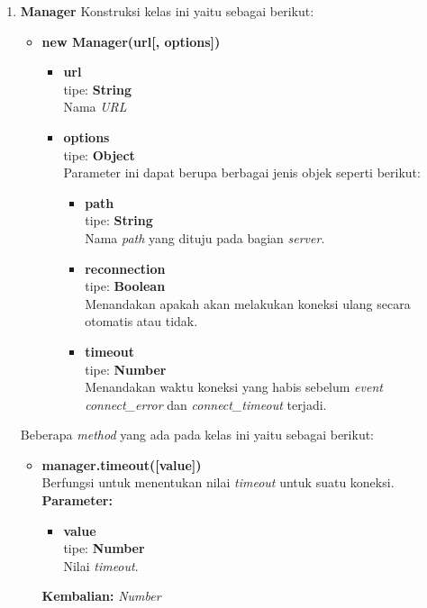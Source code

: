 \begin{enumerate}
	\item \textbf{Manager}
	Konstruksi kelas ini yaitu sebagai berikut:
	\begin{itemize}
		\item \textbf{new Manager(url[, options])} \\
		\begin{itemize}
			\item \textbf{url} \\tipe: \textbf{String} \\ Nama \textit{URL}
			\item \textbf{options} \\tipe: \textbf{Object} \\ Parameter ini dapat berupa berbagai jenis objek seperti berikut:
			\begin{itemize}
				\item \textbf{path} \\tipe: \textbf{String} \\ Nama \textit{path} yang dituju pada bagian \textit{server}.
				\item \textbf{reconnection} \\tipe: \textbf{Boolean} \\ Menandakan apakah akan melakukan koneksi ulang secara otomatis atau tidak.
				\item \textbf{timeout} \\tipe: \textbf{Number} \\ Menandakan waktu koneksi yang habis sebelum \textit{event connect\_error} dan \textit{connect\_timeout} terjadi.
			\end{itemize}
		\end{itemize}
	\end{itemize}

	Beberapa \textit{method} yang ada pada kelas ini yaitu sebagai berikut:
	\begin{itemize}
		\item \textbf{manager.timeout([value])} \\
		Berfungsi untuk menentukan nilai \textit{timeout} untuk suatu koneksi.\\
		\textbf{Parameter:}
		\begin{itemize}
			\item \textbf{value} \\tipe: \textbf{Number} \\ Nilai \textit{timeout}.
		\end{itemize}
		\textbf{Kembalian:} \textit{Number}
		

\end{itemize}
\end{enumerate}
